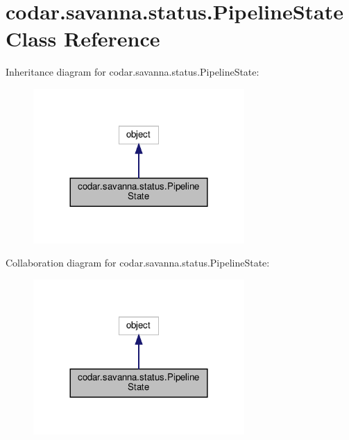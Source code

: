 \hypertarget{classcodar_1_1savanna_1_1status_1_1_pipeline_state}{}\section{codar.\+savanna.\+status.\+Pipeline\+State Class Reference}
\label{classcodar_1_1savanna_1_1status_1_1_pipeline_state}


Inheritance diagram for codar.\+savanna.\+status.\+Pipeline\+State\+:
\nopagebreak
\begin{figure}[H]
\begin{center}
\leavevmode
\includegraphics[width=228pt]{classcodar_1_1savanna_1_1status_1_1_pipeline_state__inherit__graph}
\end{center}
\end{figure}


Collaboration diagram for codar.\+savanna.\+status.\+Pipeline\+State\+:
\nopagebreak
\begin{figure}[H]
\begin{center}
\leavevmode
\includegraphics[width=228pt]{classcodar_1_1savanna_1_1status_1_1_pipeline_state__coll__graph}
\end{center}
\end{figure}
